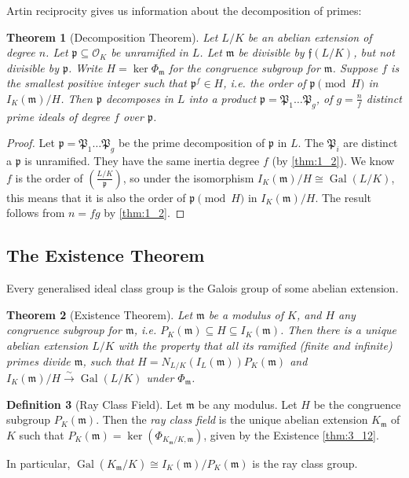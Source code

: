 \documentclass[11pt]{article}
\theoremstyle{definition}
\newtheorem{definition}{Definition}[section]
\theoremstyle{plain}
\newtheorem{theorem}[definition]{Theorem}
\theoremstyle{remark}
\DeclareMathOperator{\Gal}{Gal}
\newcommand{\cO}{\mathcal{O}}
\newcommand{\cp}{\mathfrak{P}}
\newcommand{\ff}{\mathfrak{f}}
\newcommand{\fp}{\mathfrak{p}}
\newcommand{\fm}{\mathfrak{m}}
\newcommand{\leg}[2]{\left(\frac{#1}{#2}\right)}
\begin{document}
\noindent Artin reciprocity gives us information about the decomposition of primes:

\begin{theorem}[Decomposition Theorem]\label{thm:3_11}
    Let $L/K$ be an abelian extension of degree $n$. Let $\fp \subseteq \cO_K$ be unramified in $L$. Let $\fm$ be divisible by $\ff(L/K)$, but not divisible by $\fp$. Write $H = \ker \Phi_\fm$ for the congruence subgroup for $\fm$. Suppose $f$ is the smallest positive integer such that $\fp^f \in H$, i.e. the order of $\fp \pmod{H}$ in $I_K(\fm) / H$. Then $\fp$ decomposes in $L$ into a product $\fp = \cp_1 \ldots \cp_g$, of $g = \frac{n}{f}$ distinct prime ideals of degree $f$ over $\fp$.
\end{theorem}
\begin{proof}
    Let $\fp = \cp_1 \ldots \cp_g$ be the prime decomposition of $\fp$ in $L$. The $\cp_i$ are distinct a $\fp$ is unramified. They have the same inertia degree $f$ (by \autoref{thm:1_2}). We know $f$ is the order of $\leg{L/K}{\fp}$, so under the isomorphism $I_K(\fm) / H \cong \Gal(L/K)$, this means that it is also the order of $\fp \pmod{H}$ in $I_K(\fm) / H$. The result follows from $n = fg$ by \autoref{thm:1_2}.
\end{proof}

\subsection{The Existence Theorem}

Every generalised ideal class group is the Galois group of some abelian extension.

\begin{theorem}[Existence Theorem]\label{thm:3_12}
    Let $\fm$ be a modulus of $K$, and $H$ any congruence subgroup for $\fm$, i.e. $P_K(\fm) \subseteq H \subseteq I_K(\fm)$. Then there is a unique abelian extension $L/K$ with the property that all its ramified (finite and infinite) primes divide $\fm$, such that $H = N_{L/K}(I_L(\fm)) P_K(\fm)$ and $I_K(\fm) / H \xrightarrow{\sim} \Gal(L/K)$ under $\Phi_\fm$.
\end{theorem}

\begin{definition}[Ray Class Field]\label{def:3_13}
    Let $\fm$ be any modulus. Let $H$ be the congruence subgroup $P_K(\fm)$. Then the \emph{ray class field} is the unique abelian extension $K_\fm$ of $K$ such that $P_K(\fm) = \ker(\Phi_{K_\fm / K, \fm})$, given by the Existence \autoref{thm:3_12}.

    In particular, $\Gal(K_\fm / K) \cong I_K(\fm)/P_K(\fm)$ is the ray class group.
\end{definition}
\end{document}
